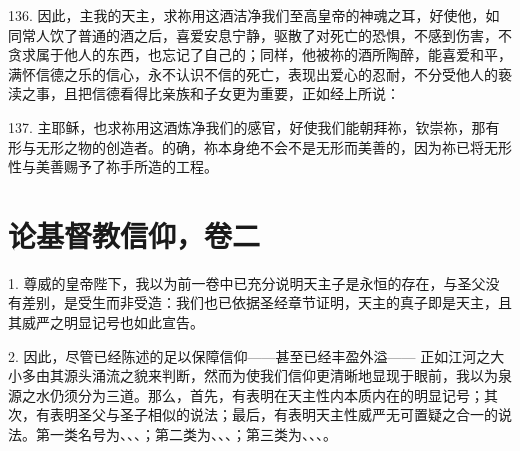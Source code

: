 136. 因此，主我的天主，求祢用这酒洁净我们至高皇帝的神魂之耳，好使他，如同常人饮了普通的酒之后，喜爱安息宁静，驱散了对死亡的恐惧，不感到伤害，不贪求属于他人的东西，也忘记了自己的；同样，他被祢的酒所陶醉，能喜爱和平，满怀信德之乐的信心，永不认识不信的死亡，表现出爱心的忍耐，不分受他人的亵渎之事，且把信德看得比亲族和子女更为重要，正如经上所说：\par

137. 主耶稣，也求祢用这酒炼净我们的感官，好使我们能朝拜祢，钦崇祢，那有形与无形之物的创造者。的确，祢本身绝不会不是无形而美善的，因为祢已将无形性与美善赐予了祢手所造的工程。\par



\section{论基督教信仰，卷二}


\par

1. 尊威的皇帝陛下，我以为前一卷中已充分说明天主子是永恒的存在，与圣父没有差别，是受生而非受造：我们也已依据圣经章节证明，天主的真子即是天主，且其威严之明显记号也如此宣告。\par

2. 因此，尽管已经陈述的足以保障信仰——甚至已经丰盈外溢—— 正如江河之大小多由其源头涌流之貌来判断，然而为使我们信仰更清晰地显现于眼前，我以为泉源之水仍须分为三道。那么，首先，有表明在天主性内本质内在的明显记号；其次，有表明圣父与圣子相似的说法；最后，有表明天主性威严无可置疑之合一的说法。第一类名号为、、、；第二类为、、、；第三类为、、、。\par

